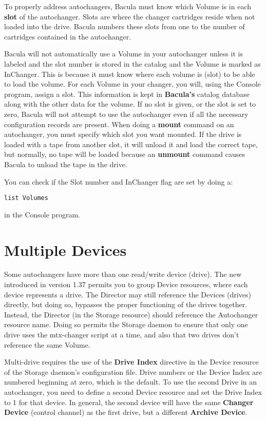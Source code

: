 To properly address autochangers, Bacula must know which Volume is in each
{\bf slot} of the autochanger. Slots are where the changer cartridges reside
when not loaded into the drive. Bacula numbers these slots from one to the
number of cartridges contained in the autochanger. 

Bacula will not automatically use a Volume in your autochanger unless it is
labeled and the slot number is stored in the catalog and the Volume is marked
as InChanger. This is because it must know where each volume is (slot) to
be able to load the volume.
For each Volume in your
changer, you will, using the Console program, assign a slot. This information
is kept in {\bf Bacula's} catalog database along with the other data for the
volume. If no slot is given, or the slot is set to zero, Bacula will not
attempt to use the autochanger even if all the necessary configuration records
are present. When doing a {\bf mount} command on an autochanger, you must
specify which slot you want mounted.  If the drive is loaded with a tape 
from another slot, it will unload it and load the correct tape, but
normally, no tape will be loaded because an {\bf unmount} command causes
Bacula to unload the tape in the drive.
          

You can check if the Slot number and InChanger flag are set by doing a:
\begin{verbatim}
list Volumes
\end{verbatim}

in the Console program.

\label{mult}
\section{Multiple Devices}

Some autochangers have more than one read/write device (drive). The
new  introduced in version
1.37 permits you to group Device resources, where each device 
represents a drive. The Director may still reference the Devices (drives)
directly, but doing so, bypasses the proper functioning of the
drives together.  Instead, the Director (in the Storage resource)
should reference the Autochanger resource name. Doing so permits 
the Storage daemon to ensure that only one drive uses the mtx-changer
script at a time, and also that two drives don't reference the
same Volume.

Multi-drive requires the use of the {\bf
Drive Index} directive in the Device resource of the Storage daemon's
configuration file. Drive numbers or the Device Index are numbered beginning
at zero, which is the default. To use the second Drive in an autochanger, you
need to define a second Device resource and set the Drive Index to 1 for
that device. In general, the second device will have the same {\bf Changer
Device} (control channel) as the first drive, but a different {\bf Archive
Device}. 

